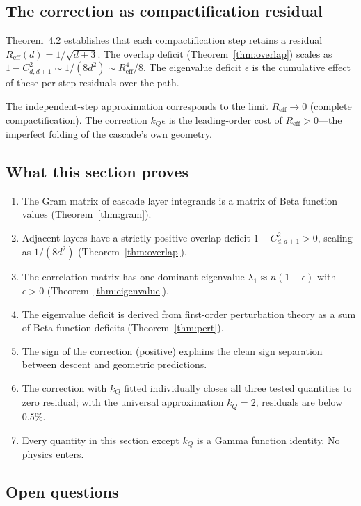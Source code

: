 \documentclass[12pt,a4paper]{article}
\theoremstyle{remark}
\begin{document}
\subsection{The correction as compactification residual}

Theorem~4.2 establishes that each compactification step retains a residual $R_{\mathrm{eff}}(d) = 1/\sqrt{d+3}$. The overlap deficit (Theorem~\ref{thm:overlap}) scales as $1-C_{d,d+1}^2 \sim 1/(8d^2) \sim R_{\mathrm{eff}}^4/8$. The eigenvalue deficit $\epsilon$ is the cumulative effect of these per-step residuals over the path.

The independent-step approximation corresponds to the limit $R_{\mathrm{eff}} \to 0$ (complete compactification). The correction $k_Q\epsilon$ is the leading-order cost of $R_{\mathrm{eff}} > 0$---the imperfect folding of the cascade's own geometry.

\subsection{What this section proves}

\begin{enumerate}[nosep]
\item The Gram matrix of cascade layer integrands is a matrix of Beta function values (Theorem~\ref{thm:gram}).
\item Adjacent layers have a strictly positive overlap deficit $1 - C_{d,d+1}^2 > 0$, scaling as $1/(8d^2)$ (Theorem~\ref{thm:overlap}).
\item The correlation matrix has one dominant eigenvalue $\lambda_1 \approx n(1 - \epsilon)$ with $\epsilon > 0$ (Theorem~\ref{thm:eigenvalue}).
\item The eigenvalue deficit is derived from first-order perturbation theory as a sum of Beta function deficits (Theorem~\ref{thm:pert}).
\item The sign of the correction (positive) explains the clean sign separation between descent and geometric predictions.
\item The correction with $k_Q$ fitted individually closes all three tested quantities to zero residual; with the universal approximation $k_Q = 2$, residuals are below $0.5\%$.
\item Every quantity in this section except $k_Q$ is a Gamma function identity. No physics enters.
\end{enumerate}

\subsection{Open questions}\label{sec:open}
\end{document}
